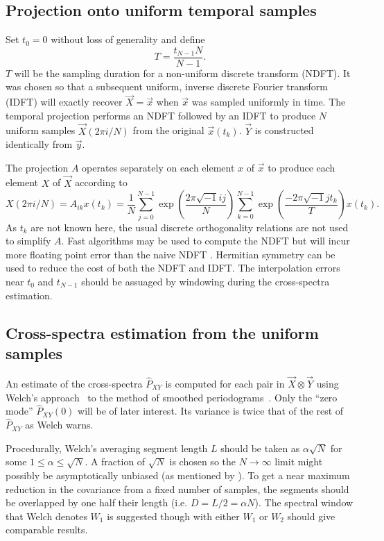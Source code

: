 \documentclass[letterpaper,11pt,nointlimits,reqno]{amsart}
\begin{document}
\subsection*{Projection onto uniform temporal samples}

Set $t_0=0$ without loss of generality and define
$$
T = \frac{t_{N-1} N}{N-1}.
$$
$T$ will be the sampling duration for a non-uniform discrete transform (NDFT).
It was chosen so that a subsequent uniform, inverse discrete Fourier transform
(IDFT) will exactly recover $\vec{X}=\vec{x}$ when $\vec{x}$ was sampled
uniformly in time.  The temporal projection performs an NDFT followed by an
IDFT to produce $N$ uniform samples $\vec{X}\left(2\pi{}i/N\right)$ from the
original $\vec{x}\left(t_k\right)$.  $\vec{Y}$ is constructed identically from
$\vec{y}$.

The projection $A$ operates separately on each element $x$ of $\vec{x}$
to produce each element $X$ of $\vec{X}$ according to
$$
    X\left(2\pi{}i/N\right)
    =
    A_{ik} x\left(t_k\right)
    =
    \frac{1}{N}
    \sum_{j=0}^{N-1} \exp\left(\frac{ 2\pi\sqrt{-1} i j   }{N} \right)
    \sum_{k=0}^{N-1} \exp\left(\frac{-2\pi\sqrt{-1} j t_k }{T} \right)
    x\left(t_k\right)
.
$$
As $t_k$ are not known here, the usual discrete orthogonality relations are not
used to simplify $A$.  Fast algorithms may be used to compute the NDFT but will
incur more floating point error than the naive NDFT
\citep[see][]{Kunis2008Time}.  Hermitian symmetry can be used to reduce the
cost of both the NDFT and IDFT.  The interpolation errors near $t_0$ and
$t_{N-1}$ should be assuaged by windowing during the cross-spectra estimation.

\subsection*{Cross-spectra estimation from the uniform samples}

An estimate of the cross-spectra $\hat{P}_{XY}$ is computed for each pair in
$\vec{X} \otimes \vec{Y}$ using Welch's approach~\citep{Welch1967Use} to the
method of smoothed periodograms~\citep{Bartlett1948Smoothing}.  Only the ``zero
mode'' $\hat{P}_{XY}(0)$ will be of later interest.  Its variance is twice that
of the rest of $\hat{P}_{XY}$ as Welch warns.

Procedurally, Welch's averaging segment length $L$ should be taken as
$\alpha\sqrt{N}$ for some $1\le\alpha\le\sqrt{N}$.  A fraction of $\sqrt{N}$ is
chosen so the $N\to\infty$ limit might possibly be asymptotically unbiased (as
mentioned by \citet[p. 803]{Thiebaux1984Interpretation}).  To get a near
maximum reduction in the covariance from a fixed number of samples, the
segments should be overlapped by one half their length (i.e.  $D = L / 2 =
\alpha{}N$).  The spectral window that Welch denotes $W_1$ is suggested though
with either $W_1$ or $W_2$ should give comparable results.
\end{document}
